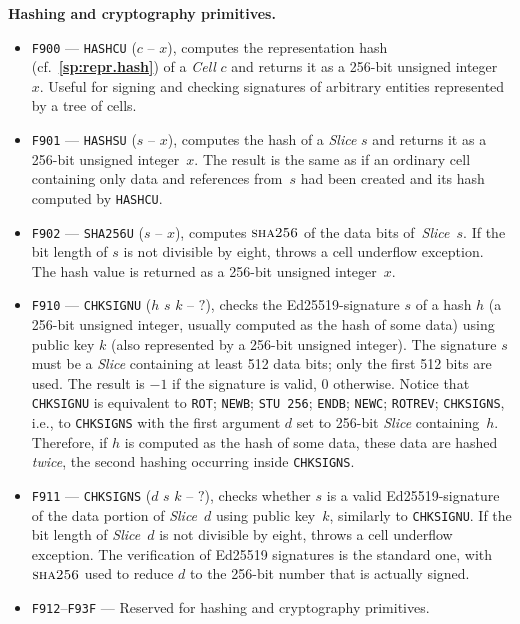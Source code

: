 \documentclass[12pt,oneside]{article}
\def\makepoint#1{\medbreak\noindent{\bf #1.\ }}
\def\nxsubpoint{\refstepcounter{subsubsection}%
  \smallbreak\makepoint{\thesubsubsection}}
\def\refpoint#1{{\rm\textbf{\ref{#1}}}}
\let\ptref=\refpoint
\def\emb#1{\textbf{#1.}}
\def\opsc#1{\operatorname{\textsc{#1}}}
\def\Sha{\opsc{sha256}}
\begin{document}
\nxsubpoint\emb{Hashing and cryptography primitives}
\begin{itemize}
\item {\tt F900} --- {\tt HASHCU} ($c$ -- $x$), computes the representation hash (cf.~\ptref{sp:repr.hash}) of a {\em Cell\/} $c$ and returns it as a 256-bit unsigned integer~$x$. Useful for signing and checking signatures of arbitrary entities represented by a tree of cells.
\item {\tt F901} --- {\tt HASHSU} ($s$ -- $x$), computes the hash of a {\em Slice\/} $s$ and returns it as a 256-bit unsigned integer~$x$. The result is the same as if an ordinary cell containing only data and references from~$s$ had been created and its hash computed by {\tt HASHCU}.
\item {\tt F902} --- {\tt SHA256U} ($s$ -- $x$), computes $\Sha$ of the data bits of~{\em Slice\/}~$s$. If the bit length of $s$ is not divisible by eight, throws a cell underflow exception. The hash value is returned as a 256-bit unsigned integer~$x$.
\item {\tt F910} --- {\tt CHKSIGNU} ($h$ $s$ $k$ -- $?$), checks the Ed25519-signature $s$ of a hash $h$ (a 256-bit unsigned integer, usually computed as the hash of some data) using public key $k$ (also represented by a 256-bit unsigned integer). The signature $s$ must be a {\em Slice\/} containing at least 512 data bits; only the first 512 bits are used. The result is $-1$ if the signature is valid, $0$ otherwise. Notice that {\tt CHKSIGNU} is equivalent to {\tt ROT}; {\tt NEWB}; {\tt STU 256}; {\tt ENDB}; {\tt NEWC}; {\tt ROTREV}; {\tt CHKSIGNS}, i.e., to {\tt CHKSIGNS} with the first argument $d$ set to 256-bit {\em Slice} containing~$h$. Therefore, if $h$ is computed as the hash of some data, these data are hashed {\em twice}, the second hashing occurring inside {\tt CHKSIGNS}. 
\item {\tt F911} --- {\tt CHKSIGNS} ($d$ $s$ $k$ -- $?$), checks whether $s$ is a valid Ed25519-signature of the data portion of {\em Slice\/}~$d$ using public key~$k$, similarly to {\tt CHKSIGNU}. If the bit length of {\em Slice\/}~$d$ is not divisible by eight, throws a cell underflow exception. The verification of Ed25519 signatures is the standard one, with $\Sha$ used to reduce $d$ to the 256-bit number that is actually signed. 
\item {\tt F912}--{\tt F93F} --- Reserved for hashing and cryptography primitives.
\end{itemize}
\end{document}
